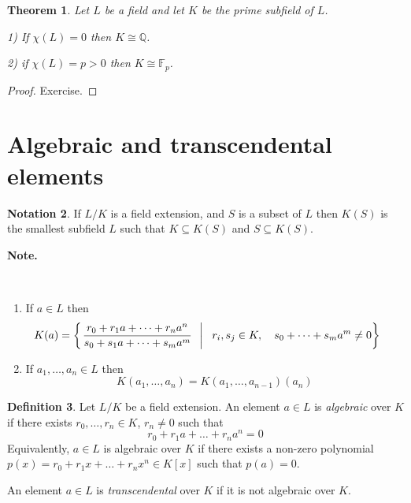 \documentclass[12pt, letterpaper, oneside]{article}
\theoremstyle{plain}
\newtheorem{theorem}{Theorem}[section]
\theoremstyle{definition}
\newtheorem{definition}[theorem]{Definition}
\newtheorem{notation}[theorem]{Notation}
\newcommand{\Q}{{\mathbb Q}}
\newcommand{\F}{{\mathbb F}}
\newcommand{\benu}{\begin{enumerate}}
\newcommand{\eenu}{\end{enumerate}}
\newcommand{\vs}{\vskip 5mm}
\begin{document}
\vs\vs


\begin{theorem}
\label{THM_PRIMESUBFIELD}
Let $L$ be a field and let $K$ be the prime subfield of $L$.  

1) If $\chi(L) = 0$ then $K \cong \Q$.

2) if $\chi(L) = p>0$ then $K \cong \F_{p}$.
\end{theorem}


\vs 

\begin{proof}
Exercise.
\end{proof}








\newpage
\section{Algebraic and transcendental elements}
\label{SEC_ALGTRANSCELTS}

\begin{notation}
If $L/K$ is a field extension, and $S$ is a subset of $L$ then $K(S)$ is the smallest
subfield $L$ such that $K\subseteq K(S)$ and $S \subseteq K(S)$. 
\end{notation}

\vs

\textbf{Note.}

\vskip -13mm

\ 
\benu
\item If $a\in L$ then 
$$\hskip -5mmK(a)  = 
\left\{ \left. \frac{r_{0} + r_{1}a +\dots + r_{n}a^{n}}{s_{0} + s_{1}a + \dots + s_{m}a^{m}} \ \ \right| \ \ 
r_{i}, s_{j} \in K,\ \ \  s_{0}  + \dots + s_{m}a^{m}\neq 0 \right\}$$

\item If $a_{1}, \dots, a_{n}\in L$ then 
$$K(a_{1}, \dots, a_{n}) = K(a_{1}, \dots, a_{n-1})(a_{n})$$

\eenu



\vs\vs


\begin{definition}
Let $L/K$ be a field extension. An element $a\in L$ is \emph{algebraic} over $K$ if 
there exists $r_{0}, \dots, r_{n}\in K$, $r_{n}\neq 0$ such that
$$r_{0} + r_{1}a + \dots + r_{n}a^{n} = 0$$
Equivalently, $a\in L$ is algebraic over $K$ if there exists a non-zero polynomial 
$p(x) = r_{0} + r_{1}x + \dots + r_{n}x^{n} \in K[x]$ such that $p(a) = 0$.

An element $a\in L$ is \emph{transcendental} over $K$ if it is not algebraic over $K$.
\end{definition}
\end{document}
